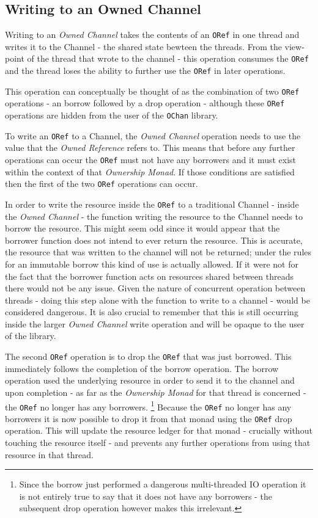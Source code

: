 \documentclass[onehalf,11pt]{beavtex}
\begin{document}
\subsection{Writing to an Owned Channel}

Writing to an \textit{Owned Channel} takes the contents of an \texttt{ORef} in
one thread and writes it to the Channel - the shared state bewteen the threads.
From the view-point of the thread that wrote to the channel - this operation
consumes the \texttt{ORef} and the thread loses the ability to further use the
\texttt{ORef} in later operations.

This operation can conceptually be thought of as the combination of two
\texttt{ORef} operations - an borrow followed by a drop operation -
although these \texttt{ORef} operations are hidden from the user of the
\texttt{OChan} library.

To write an \texttt{ORef} to a Channel, the \textit{Owned Channel} operation
needs to use the value that the \textit{Owned Reference} refers to.  This means
that before any further operations can occur the \texttt{ORef} must not have any
borrowers and it must exist within the context of that \textit{Ownership Monad}.
If those conditions are satisfied then the first of the two \texttt{ORef}
operations can occur.

In order to write the resource inside the \texttt{ORef} to a traditional Channel
- inside the \textit{Owned Channel} - the function writing the resource to the
Channel needs to borrow the resource.
This might seem odd since it would appear that the borrower function does not
intend to ever return the resource.  This is accurate, the resource that was
written to the channel will not be returned; under the rules for an immutable
borrow this kind of use is actually allowed.  If it were not for the fact that
the borrower function acts on resources shared between threads there would not be
any issue.  Given the nature of concurrent operation between threads - doing
this step alone with the function to write to a channel - would be considered
dangerous.  It is also crucial to remember that this is still occurring inside
the larger \textit{Owned Channel} write operation and will be opaque to the user
of the library.

The second \texttt{ORef} operation is to drop the \texttt{ORef} that was just
borrowed. This immediately follows the completion of the borrow operation. The
borrow operation used the underlying resource in order to send it to the channel
and upon completion - as far as the \textit{Ownership Monad} for that thread is
concerned - the \texttt{ORef} no longer has any borrowers.
\footnote{Since the borrow just performed a dangerous multi-threaded IO operation
  it is not entirely true to say that it does not have any borrowers - the
  subsequent drop operation however makes this irrelevant.}
Because the \texttt{ORef} no longer has any borrowers it is now possible to
drop it from that monad using the \texttt{ORef} drop operation.  This will
update the resource ledger for that monad - crucially without touching the
resource itself - and prevents any further operations from using that resource
in that thread.
\end{document}
